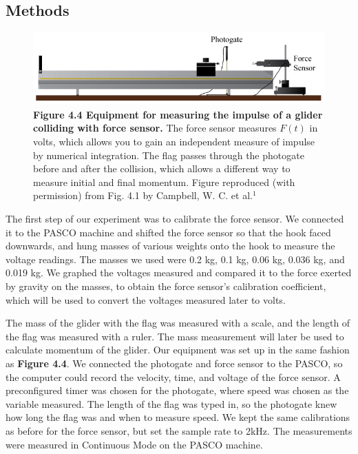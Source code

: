 \documentclass[11pt]{report}
\begin{document}
\subsection*{Methods}
\begin{figure}[h!]
    \includegraphics[width=\linewidth]{Figure44.png}
    \captionsetup{labelformat=empty}
    \caption{\textbf{Figure 4.4 Equipment for measuring the impulse of a glider
        colliding with force sensor.}
    The force sensor measures \(F(t)\) in volts, which allows you to gain an
independent measure of impulse by numerical integration.  The flag passes
through the photogate before and after the collision, which allows a different
way to measure initial and final momentum. Figure reproduced (with permission)
from Fig. 4.1 by Campbell, W. C. et al.$^1$}
\end{figure}

The first step of our experiment was to calibrate the force sensor.
We connected it to the PASCO machine and shifted the force sensor so that the
hook faced downwards, and hung masses of
various weights onto the hook to measure the voltage readings.  The masses we
used were 0.2 kg, 0.1 kg, 0.06 kg, 0.036 kg, and 0.019 kg. We graphed the
voltages measured and compared it to the force exerted by gravity on the masses,
to obtain the force sensor's calibration coefficient, which will be used to convert 
the voltages measured later to volts.

\setlength{\parindent}{5ex}
The mass of the glider with the flag was measured with a scale, and the length of the flag was
measured with a ruler.  The mass measurement will later be used to calculate
momentum of the glider.  Our equipment was set up in the same fashion as
\textbf{Figure 4.4}.  We connected the photogate and force sensor to the PASCO,
so the computer could record the velocity, time, and voltage of the force
sensor.  A preconfigured timer was chosen for the photogate, where speed was
chosen as the variable measured.  The length of the flag was typed in, so the
photogate knew how long the flag was and when to measure speed.  We kept the
same calibrations as before for the force sensor, but set the sample rate to
2kHz.  The measurements were measured in Continuous Mode on the PASCO machine.
\end{document}
